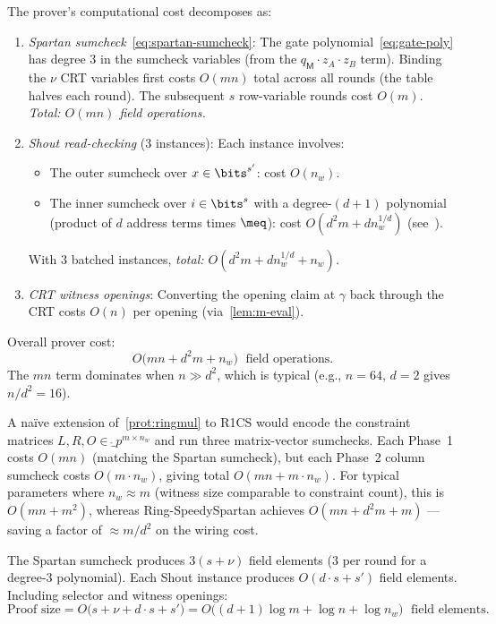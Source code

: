 The prover's computational cost decomposes as:

\begin{enumerate}
    \item \emph{Spartan sumcheck}~\eqref{eq:spartan-sumcheck}: The gate polynomial~\eqref{eq:gate-poly} has degree 3 in the sumcheck variables (from the $q_\mathsf{M} \cdot z_A \cdot z_B$ term).
    Binding the $\nu$ CRT variables first costs $O(mn)$ total across all rounds (the table halves each round).
    The subsequent $s$ row-variable rounds cost $O(m)$.
    \emph{Total: $O(mn)$ field operations.}

    \item \emph{Shout read-checking} (3 instances): Each instance involves:
    \begin{itemize}
        \item The outer sumcheck over $x \in \bits^{s'}$: cost $O(n_w)$.
        \item The inner sumcheck over $i \in \bits^s$ with a degree-$(d+1)$ polynomial (product of $d$ address terms times $\meq$): cost $O(d^2 m + d n_w^{1/d})$ (see~\cite[Lemma 4.2]{twist-and-shout}).
    \end{itemize}
    With 3 batched instances, \emph{total: $O(d^2 m + d n_w^{1/d} + n_w)$.}

    \item \emph{CRT witness openings}: Converting the opening claim at $\gamma$ back through the CRT costs $O(n)$ per opening (via~\cref{lem:m-eval}).
\end{enumerate}

\noindent
Overall prover cost:
\[
    \boxed{O\bigl(mn + d^2 m + n_w\bigr) \;\text{ field operations.}}
\]
The $mn$ term dominates when $n \gg d^2$, which is typical (e.g., $n = 64$, $d = 2$ gives $n/d^2 = 16$).

A na\"ive extension of~\cref{prot:ringmul} to R1CS would encode the constraint matrices $L, R, O \in \ring_p^{m \times n_w}$ and run three matrix-vector sumchecks. Each Phase~1 costs $O(mn)$ (matching the Spartan sumcheck), but each Phase~2 column sumcheck costs $O(m \cdot n_w)$, giving total $O(mn + m \cdot n_w)$. For typical parameters where $n_w \approx m$ (witness size comparable to constraint count), this is $O(mn + m^2)$, whereas Ring-SpeedySpartan achieves $O(mn + d^2 m + m)$ --- saving a factor of $\approx m/d^2$ on the wiring cost.

The Spartan sumcheck produces $3(s + \nu)$ field elements ($3$ per round for a degree-3 polynomial).
Each Shout instance produces $O(d \cdot s + s')$ field elements.
Including selector and witness openings:
\[
    \text{Proof size} = O\bigl(s + \nu + d \cdot s + s'\bigr) = O\bigl((d+1)\log m + \log n + \log n_w\bigr) \;\text{ field elements.}
\]

